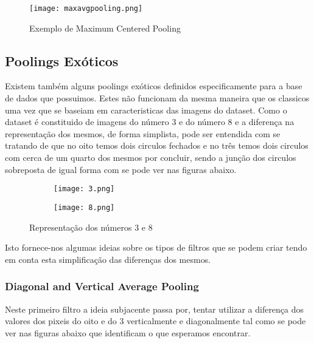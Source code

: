   \begin{figure}[H]

    \centering
    \captionsetup{justification=centering}

    \texttt{[image: maxavgpooling.png]}
    
    \caption {Exemplo de Maximum Centered Pooling}
  \end{figure}


\subsection{Poolings Exóticos}
\label{subsec:poolingExotico}

Existem também alguns poolings exóticos definidos especificamente para a base de dados que possuimos. Estes não funcionam da mesma maneira que os classicos uma vez que se baseiam em caracteristicas das imagens do dataset. \newline
Como o dataset é constituido de imagens do número 3 e do número 8 e a diferença na representação dos mesmos, de forma simplista, pode ser entendida com se tratando de que no oito temos dois circulos fechados e no três temos dois circulos com cerca de um quarto dos mesmos por concluir, sendo a junção dos circulos sobreposta de igual forma com se pode ver nas figuras abaixo.

\begin{figure}[H]

  \captionsetup{justification=centering}
  \begin{subfigure}{.5\textwidth}
  \centering
  \texttt{[image: 3.png]}
  \end{subfigure}
  \begin{subfigure}{.5\textwidth}
  \centering
   \texttt{[image: 8.png]}
   \end{subfigure}
  \caption {Representação dos números 3 e 8}
\end{figure}

Isto fornece-nos algumas ideias sobre os tipos de filtros que se podem criar tendo em conta esta simplificação das diferenças dos mesmos.


\subsubsection{ Diagonal and Vertical Average Pooling}\hfill\newline
  \hfill\newline
  Neste primeiro filtro a ideia subjacente passa por, tentar utilizar a diferença dos valores dos pixeis do oito e do 3 verticalmente e diagonalmente tal como se pode ver nas figuras abaixo que identificam o que esperamos encontrar. \hfill\newline

